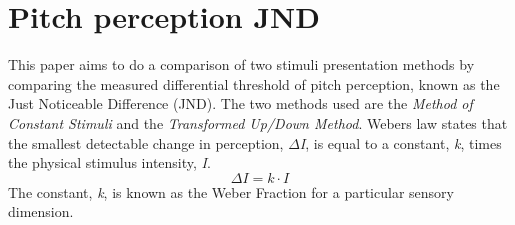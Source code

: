 \chapter*{Pitch perception JND}
%
This paper aims to do a comparison of two stimuli presentation methods by comparing the measured differential threshold of pitch perception, known as the Just Noticeable Difference (JND). The two methods used are the \textit{Method of Constant Stimuli} and the \textit{Transformed Up/Down Method}. Webers law states that the smallest detectable change in perception, $\Delta$\textit{I}, is equal to a constant, \textit{k}, times the physical stimulus intensity, \textit{I}.
%
\begin{equation}
\Delta I= k \cdot I
\end{equation}
%
The constant, \textit{k}, is known as the Weber Fraction for a particular sensory dimension.
